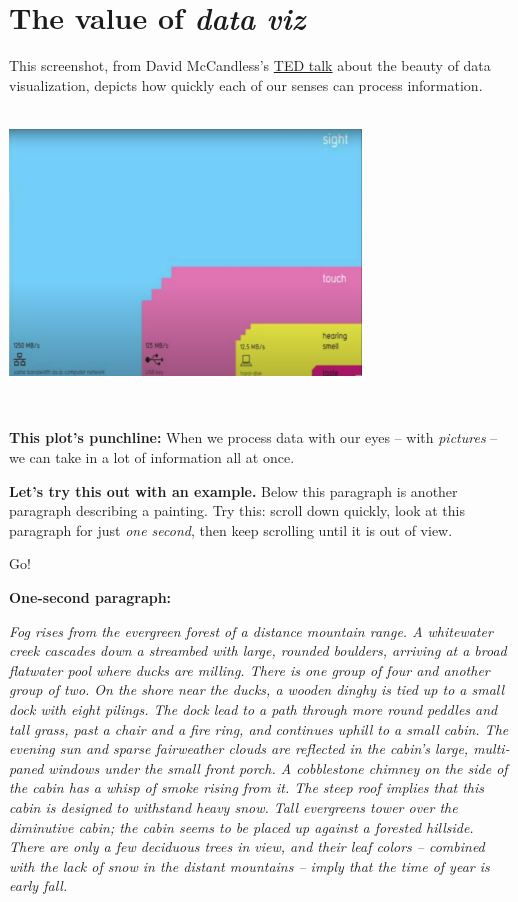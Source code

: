 \documentclass[]{book}
\begin{document}
\hypertarget{the-value-of-data-viz}{%
\section*{\texorpdfstring{The value of \emph{data viz}}{The value of data viz}}\label{the-value-of-data-viz}}

This screenshot, from David McCandless's \href{https://www.youtube.com/watch?v=5Zg-C8AAIGg}{TED talk} about the beauty of data visualization, depicts how quickly each of our senses can process information.

~\\

\includegraphics[width=0.7\textwidth,height=\textheight]{img/vis0.png}

~

\textbf{This plot's punchline:} When we process data with our eyes -- with \emph{pictures} -- we can take in a lot of information all at once.

\textbf{Let's try this out with an example.} Below this paragraph is another paragraph describing a painting. Try this: scroll down quickly, look at this paragraph for just \emph{one second}, then keep scrolling until it is out of view.

Go!

\textbf{One-second paragraph:}

\emph{Fog rises from the evergreen forest of a distance mountain range. A whitewater creek cascades down a streambed with large, rounded boulders, arriving at a broad flatwater pool where ducks are milling. There is one group of four and another group of two. On the shore near the ducks, a wooden dinghy is tied up to a small dock with eight pilings. The dock lead to a path through more round peddles and tall grass, past a chair and a fire ring, and continues uphill to a small cabin. The evening sun and sparse fairweather clouds are reflected in the cabin's large, multi-paned windows under the small front porch. A cobblestone chimney on the side of the cabin has a whisp of smoke rising from it. The steep roof implies that this cabin is designed to withstand heavy snow. Tall evergreens tower over the diminutive cabin; the cabin seems to be placed up against a forested hillside. There are only a few deciduous trees in view, and their leaf colors -- combined with the lack of snow in the distant mountains -- imply that the time of year is early fall.}
\end{document}
